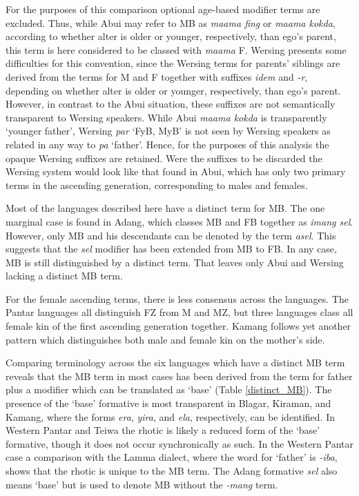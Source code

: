 For the purposes of this comparison optional age-based modifier terms are excluded. Thus, while Abui may refer to MB as \textit{maama fing} or \textit{maama kokda}, according to whether alter is older or younger, respectively, than ego's parent, this term is here considered to be classed with \textit{maama} F. Wersing presents some difficulties for this convention, since the Wersing terms for parents' siblings are derived from the terms for M and F together with suffixes \textit{idem} and \textit{{}-r}, depending on whether alter is older or younger, respectively, than ego's parent. However, in contrast to the Abui situation, these suffixes are not semantically transparent to Wersing speakers. While Abui \textit{maama kokda} is transparently `younger father', Wersing \textit{par} `FyB, MyB' is not seen by Wersing speakers as related in any way to \textit{pa} `father'. Hence, for the purposes of this analysis the opaque Wersing suffixes are retained. Were the suffixes to be discarded the Wersing system would look like that found in Abui, which has only two primary terms in the ascending generation, corresponding to males and females.

Most of the languages described here have a distinct term for MB. The one marginal case is found in Adang, which classes MB and FB together as \textit{imang sel}. However, only MB and his descendants can be denoted by the term \textit{asel}. This suggests that the \textit{sel} modifier has been extended from MB to FB. In any case, MB is still distinguished by a distinct term. That leaves only Abui and Wersing lacking a distinct MB term. 

For the female ascending terms, there is less consensus across the languages. The Pantar languages all distinguish FZ from M and MZ, but three languages class all female kin of the first ascending generation together. Kamang follows yet another pattern which distinguishes both male and female kin on the mother's side.

Comparing terminology across the six languages which have a distinct MB term reveals that the MB term in most cases has been derived from the term for father plus a modifier which can be translated as `base' (Table \ref{distinct_MB}). The presence of the `base' formative is most transparent in Blagar, Kiraman, and Kamang, where the forms \textit{era}, \textit{yira}, and \textit{ela}, respectively, can be identified. In Western Pantar and Teiwa the rhotic is likely a reduced form of the `base' formative, though it does not occur synchronically as such. In the Western Pantar case a comparison with the Lamma dialect, where the word for `father' is \textit{-iba}, shows that the rhotic is unique to the MB term. The Adang formative \textit{sel} also means `base' but is used to denote MB without the \textit{-mang} term.

